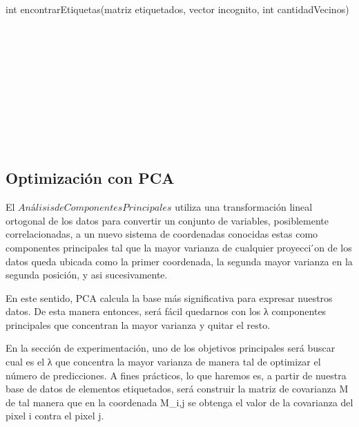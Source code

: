 \begin{algorithm}
    \begin{algorithmic}[1]\parskip=2mm
        \caption{int encontrarEtiquetas(matriz etiquetados, vector incognito, int cantidadVecinos)}
        \\
        \\
        \\
        \\
        \\
        \\
        \\
        \\
        \\
    \end{algorithmic}
\end{algorithm}


\subsection {Optimización con PCA}


El $Análisis de Componentes Principales$ utiliza una transformación lineal ortogonal de los datos para convertir un conjunto de variables, posiblemente correlacionadas, a un nuevo sistema de coordenadas conocidas estas como componentes principales tal que la mayor varianza de cualquier proyecci ́on de los datos queda ubicada como la primer coordenada, la segunda mayor varianza en la segunda posición, y asi sucesivamente. 

En este sentido, PCA calcula la base más significativa para expresar nuestros datos.
De esta manera entonces, será fácil quedarnos con los λ componentes principales que concentran la mayor varianza y quitar el resto. 

En la sección de experimentación, uno de los objetivos principales será buscar cual es el λ que concentra la mayor varianza de manera tal de optimizar el número de predicciones. A fines prácticos, lo que haremos es, a partir de nuestra base de datos de elementos etiquetados, será construir la matriz de covarianza M de tal manera que en la coordenada M_{i,j} se obtenga el valor de la covarianza del pixel i contra el pixel j. 

